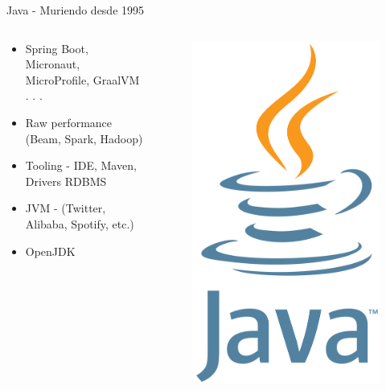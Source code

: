 \documentclass[aspectratio=169]{beamer}
\begin{document}
\begin{frame}{Java - Muriendo desde 1995}
\begin{columns}
\begin{column}{0.5\textwidth}
\begin{itemize}
	\item Spring Boot, Micronaut, MicroProfile, GraalVM . . .
	\item Raw performance (Beam, Spark, Hadoop)
	\item Tooling - IDE, Maven, Drivers RDBMS
	\item JVM - (Twitter, Alibaba, Spotify, etc.)
	\item OpenJDK
\end{itemize}
\end{column}
\begin{column}{0.5\textwidth}  %
\begin{figure}
	\centering
	\includegraphics[width=0.4\linewidth]{Images/java}
\end{figure}
\end{column}
\end{columns}
\end{frame}
\end{document}
